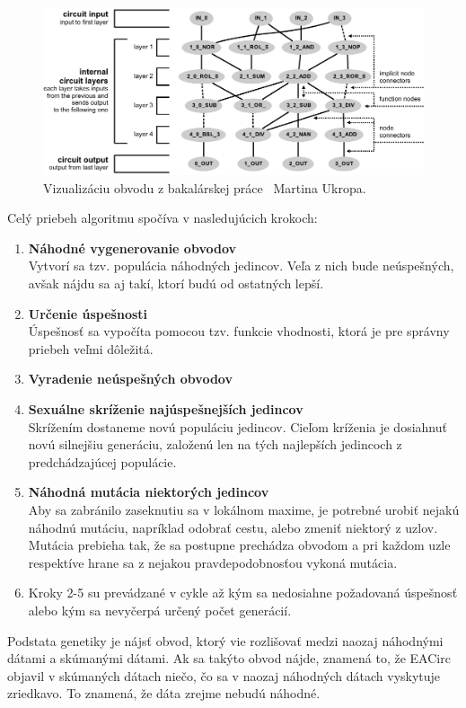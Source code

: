 \begin{figure}[h!]
	\centering
	\includegraphics[scale=0.8]{./img/circuit-final.pdf}
	\caption{Vizualizáciu obvodu z {bakalárskej práce}~\parencite{ukrop-bc} Martina Ukropa.}
	\label{obr:circuit-example}
\end{figure}

Celý priebeh algoritmu spočíva v nasledujúcich krokoch:\vspace{-10pt}
\begin{enumerate}
	\item \textbf{Náhodné vygenerovanie obvodov}\\Vytvorí sa tzv. populácia náhodných jedincov. Veľa z nich bude neúspešných, avšak nájdu sa aj takí, ktorí budú od ostatných lepší. 
	\item \textbf{Určenie úspešnosti}\\Úspešnosť sa vypočíta pomocou tzv. funkcie vhodnosti, ktorá je pre správny priebeh veľmi dôležitá.
	\item \textbf{Vyradenie neúspešných obvodov}
	\item \textbf{Sexuálne skríženie najúspešnejších jedincov}\\Skrížením dostaneme novú populáciu jedincov. Cieľom kríženia je dosiahnuť novú silnejšiu generáciu, založenú len na tých najlepších jedincoch z predchádzajúcej populácie.
	\item \textbf{Náhodná mutácia niektorých jedincov}\\Aby sa zabránilo zaseknutiu sa v lokálnom maxime, je potrebné urobiť nejakú náhodnú mutáciu, napríklad odobrať cestu, alebo zmeniť niektorý z uzlov. Mutácia prebieha tak, že sa postupne prechádza obvodom a pri každom uzle respektíve hrane sa z nejakou pravdepodobnosťou vykoná mutácia.
	\item Kroky 2-5 su prevádzané v cykle až kým sa nedosiahne požadovaná úspešnosť alebo kým sa nevyčerpá určený počet generácií.
\end{enumerate}
Podstata genetiky je nájsť obvod, ktorý vie rozlišovať medzi naozaj náhodnými dátami a skúmanými dátami. Ak sa takýto obvod nájde, znamená to, že EACirc objavil v skúmaných dátach niečo, čo sa v naozaj náhodných dátach vyskytuje zriedkavo. To znamená, že dáta zrejme nebudú náhodné.

